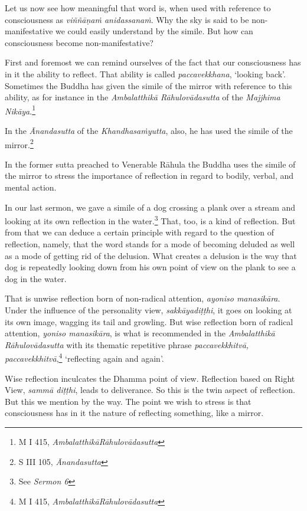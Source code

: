 Let us now see how meaningful that word is, when used with reference to consciousness as \emph{viññāṇaṁ anidassanaṁ}. Why the sky is said to be non-manifestative we could easily understand by the simile. But how can consciousness become non-manifestative?

First and foremost we can remind ourselves of the fact that our consciousness has in it the ability to reflect. That ability is called \emph{paccavekkhana}, `looking back'. Sometimes the Buddha has given the simile of the mirror with reference to this ability, as for instance in the \emph{Ambalatthikā Rāhulovādasutta} of the \emph{Majjhima Nikāya}.\footnote{M I 415, \emph{AmbalatthikāRāhulovādasutta}}

In the \emph{Ānandasutta} of the \emph{Khandhasaṁyutta}, also, he has used the simile of the mirror.\footnote{S III 105, \emph{Ānandasutta}}

In the former sutta preached to Venerable Rāhula the Buddha uses the simile of the mirror to stress the importance of reflection in regard to bodily, verbal, and mental action.

In our last sermon, we gave a simile of a dog crossing a plank over a stream and looking at its own reflection in the water.\footnote{See \emph{Sermon 6}} That, too, is a kind of reflection. But from that we can deduce a certain principle with regard to the question of reflection, namely, that the word stands for a mode of becoming deluded as well as a mode of getting rid of the delusion. What creates a delusion is the way that dog is repeatedly looking down from his own point of view on the plank to see a dog in the water.

That is unwise reflection born of non-radical attention, \emph{ayoniso manasikāra}. Under the influence of the personality view, \emph{sakkāyadiṭṭhi}, it goes on looking at its own image, wagging its tail and growling. But wise reflection born of radical attention, \emph{yoniso manasikāra}, is what is recommended in the \emph{Ambalatthikā Rāhulovādasutta} with its thematic repetitive phrase \emph{paccavekkhitvā, paccavekkhitvā},\footnote{M I 415, \emph{AmbalatthikāRāhulovādasutta}} `reflecting again and again'.

Wise reflection inculcates the Dhamma point of view. Reflection based on Right View, \emph{sammā diṭṭhi}, leads to deliverance. So this is the twin aspect of reflection. But this we mention by the way. The point we wish to stress is that consciousness has in it the nature of reflecting something, like a mirror.

